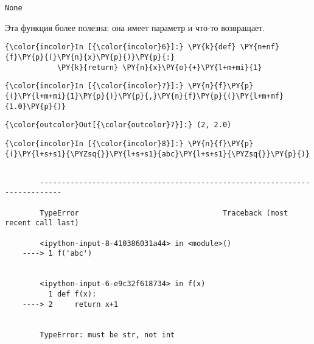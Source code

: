     \begin{Verbatim}[commandchars=\\\{\}]
None

    \end{Verbatim}

    Эта функция более полезна: она имеет параметр и что-то возвращает.

    \begin{Verbatim}[commandchars=\\\{\}]
{\color{incolor}In [{\color{incolor}6}]:} \PY{k}{def} \PY{n+nf}{f}\PY{p}{(}\PY{n}{x}\PY{p}{)}\PY{p}{:}
            \PY{k}{return} \PY{n}{x}\PY{o}{+}\PY{l+m+mi}{1}
\end{Verbatim}

    \begin{Verbatim}[commandchars=\\\{\}]
{\color{incolor}In [{\color{incolor}7}]:} \PY{n}{f}\PY{p}{(}\PY{l+m+mi}{1}\PY{p}{)}\PY{p}{,}\PY{n}{f}\PY{p}{(}\PY{l+m+mf}{1.0}\PY{p}{)}
\end{Verbatim}

            \begin{Verbatim}[commandchars=\\\{\}]
{\color{outcolor}Out[{\color{outcolor}7}]:} (2, 2.0)
\end{Verbatim}
        
    \begin{Verbatim}[commandchars=\\\{\}]
{\color{incolor}In [{\color{incolor}8}]:} \PY{n}{f}\PY{p}{(}\PY{l+s+s1}{\PYZsq{}}\PY{l+s+s1}{abc}\PY{l+s+s1}{\PYZsq{}}\PY{p}{)}
\end{Verbatim}

    \begin{Verbatim}[commandchars=\\\{\}]

        ---------------------------------------------------------------------------

        TypeError                                 Traceback (most recent call last)

        <ipython-input-8-410386031a44> in <module>()
    ----> 1 f('abc')
    

        <ipython-input-6-e9c32f618734> in f(x)
          1 def f(x):
    ----> 2     return x+1
    

        TypeError: must be str, not int

    \end{Verbatim}

